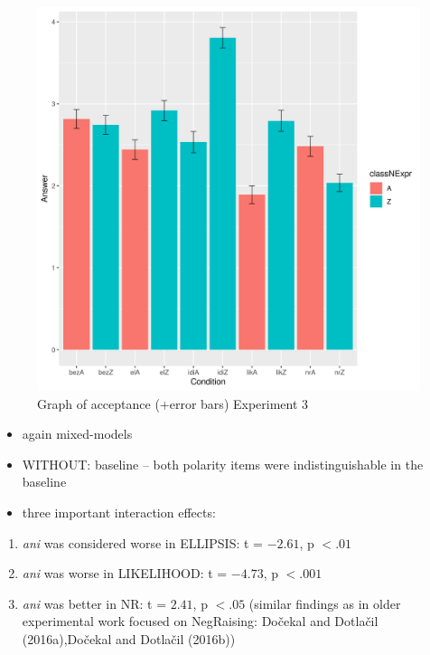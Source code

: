 \documentclass[
  ignorenonframetext,
]{beamer}
\providecommand{\tightlist}{%
  \setlength{\itemsep}{0pt}\setlength{\parskip}{0pt}}\usepackage{longtable,booktabs,array}
\newcommand{\cond}[1]{\textsc{#1}}
\begin{document}
\begin{frame}
\begin{figure}

{\centering \includegraphics{"error_bar_exp3.png"}

}

\caption{Graph of acceptance (+error bars) Experiment 3}

\end{figure}
\end{frame}

\begin{frame}
\begin{itemize}
\tightlist
\item
  again mixed-models
\item
  \cond{WITHOUT}: baseline -- both polarity items were indistinguishable
  in the baseline
\item
  three important interaction effects:
\end{itemize}

\begin{enumerate}
\item
  \emph{ani} was considered worse in \cond{ELLIPSIS}: t = \(-2.61\), p
  \(<.01\)
\item
  \emph{ani} was worse in \cond{LIKELIHOOD}: t = \(-4.73\), p \(<.001\)
\item
  \emph{ani} was better in \cond{NR}: t = \(2.41\), p \(<.05\) (similar
  findings as in older experimental work focused on NegRaising: Dočekal
  and Dotlačil (2016a),Dočekal and Dotlačil (2016b))
\end{enumerate}
\end{frame}
\end{document}
